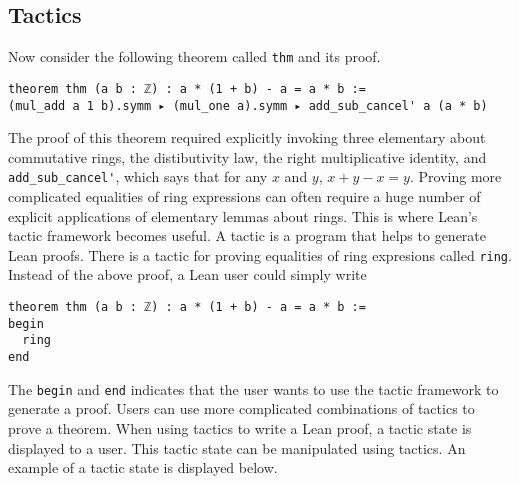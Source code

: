 \documentclass[12pt]{article} %
\theoremstyle{definition}
\theoremstyle{definition}
\theoremstyle{definition}
\theoremstyle{definition}
\theoremstyle{definition}
\theoremstyle{definition}
\begin{document}

\subsection{Tactics}

Now consider the following theorem called \lstinline{thm} and its proof.

\begin{lstlisting}
theorem thm (a b : ℤ) : a * (1 + b) - a = a * b :=
(mul_add a 1 b).symm ▸ (mul_one a).symm ▸ add_sub_cancel' a (a * b)
\end{lstlisting}

The proof of this theorem required explicitly invoking three elementary about commutative
rings, the distibutivity law, the right multiplicative identity, and
\lstinline{add_sub_cancel'}, which says that for any $x$ and $y$, $x + y - x = y$.
Proving more complicated equalities of ring expressions can often require a huge
number of explicit applications of elementary lemmas about rings. This is where Lean's
tactic framework becomes useful. A tactic is a program that helps to generate Lean proofs. There is
a tactic for proving equalities of ring expresions called \lstinline{ring}. Instead
of the above proof, a Lean user could simply write

\begin{lstlisting}
theorem thm (a b : ℤ) : a * (1 + b) - a = a * b :=
begin
  ring
end
\end{lstlisting}

The \lstinline{begin} and \lstinline{end} indicates that the user wants to use the tactic
framework to generate a proof. Users can use more complicated combinations of tactics
to prove a theorem. When using tactics to write a Lean proof, a tactic state is displayed to a user.
This tactic state can be manipulated using tactics. An example of a tactic state is displayed
below.
\end{document}
